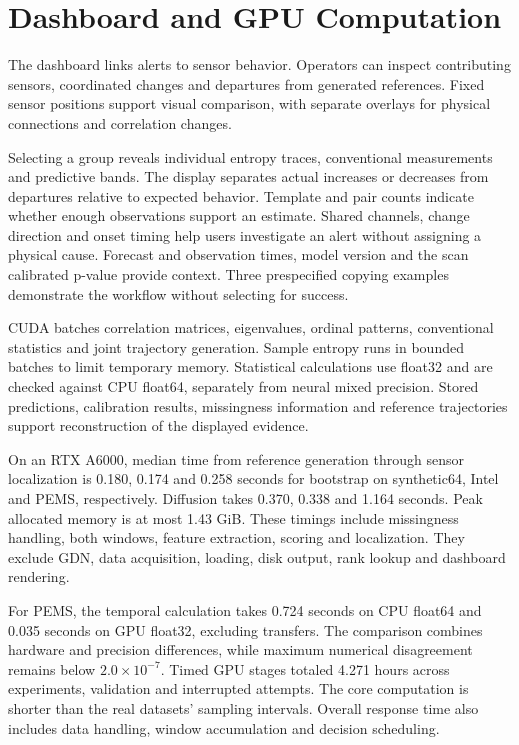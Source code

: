 \documentclass{llncs}
\begin{document}
\section{Dashboard and GPU Computation}
The dashboard links alerts to sensor behavior. Operators can inspect
contributing sensors, coordinated changes and departures from generated
references. Fixed sensor positions support visual comparison, with separate
overlays for physical connections and correlation changes.

Selecting a group reveals individual entropy traces, conventional
measurements and predictive bands. The display separates actual increases
or decreases from departures relative to expected behavior. Template and
pair counts indicate whether enough observations support an estimate.
Shared channels, change direction and onset timing help users investigate
an alert without assigning a physical cause. Forecast and observation times,
model version and the scan calibrated p-value provide context.
Three prespecified copying examples demonstrate the workflow without
selecting for success.

CUDA batches correlation matrices, eigenvalues, ordinal patterns,
conventional statistics and joint trajectory generation. Sample entropy
runs in bounded batches to limit temporary memory. Statistical calculations
use float32 and are checked against CPU float64, separately from neural
mixed precision. Stored predictions, calibration results, missingness
information and reference trajectories support reconstruction of the
displayed evidence.

On an RTX A6000, median time from reference generation through sensor
localization is 0.180, 0.174 and 0.258 seconds for bootstrap on synthetic64,
Intel and PEMS, respectively. Diffusion takes 0.370, 0.338 and 1.164 seconds.
Peak allocated memory is at most 1.43 GiB.
These timings include missingness handling, both windows, feature
extraction, scoring and localization. They exclude GDN, data acquisition,
loading, disk output, rank lookup and dashboard rendering.

For PEMS, the temporal calculation takes 0.724 seconds on CPU float64 and
0.035 seconds on GPU float32, excluding transfers. The comparison combines
hardware and precision differences, while maximum numerical disagreement
remains below $2.0\times10^{-7}$. Timed GPU stages totaled 4.271 hours
across experiments, validation and interrupted attempts.
The core computation is shorter than the real datasets' sampling intervals.
Overall response time also includes data handling, window accumulation
and decision scheduling.
\end{document}

